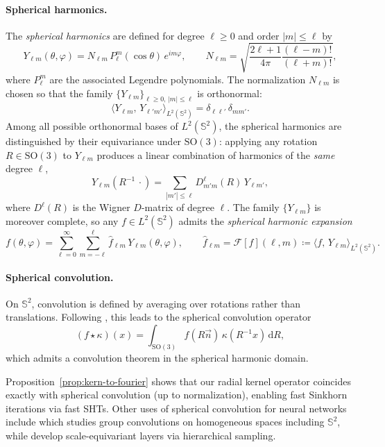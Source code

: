 \documentclass{article}
\theoremstyle{plain}
\theoremstyle{definition}
\theoremstyle{remark}
\renewcommand{\S}{\ensuremath{\mathbb{S}}}
\begin{document}
\paragraph{Spherical harmonics.}
The \emph{spherical harmonics} are defined for degree $\ell \ge 0$ and order $|m| \le \ell$ by
\[
Y_{\ell m}(\theta,\varphi)
= N_{\ell m}\, P_\ell^m(\cos\theta)\, e^{im\varphi},
\qquad
N_{\ell m} = \sqrt{\frac{2\ell+1}{4\pi}\frac{(\ell-m)!}{(\ell+m)!}},
\]
where $P_\ell^m$ are the associated Legendre polynomials.
The normalization $N_{\ell m}$ is chosen so that the family $\{Y_{\ell m}\}_{\ell \ge 0,\,|m|\le\ell}$ is orthonormal:
\[
\langle Y_{\ell m},\, Y_{\ell' m'} \rangle_{L^2(\S^2)} = \delta_{\ell\ell'}\,\delta_{mm'}.
\]
Among all possible orthonormal bases of $L^2(\S^2)$, the spherical harmonics are distinguished by their equivariance under $\mathrm{SO}(3)$: applying any rotation $R \in \mathrm{SO}(3)$ to $Y_{\ell m}$ produces a linear combination of harmonics of the \emph{same} degree $\ell$,
\[
Y_{\ell m}(R^{-1}\,\cdot) = \sum_{|m'|\le\ell} D^\ell_{m'm}(R)\, Y_{\ell m'},
\]
where $D^\ell(R)$ is the Wigner $D$-matrix of degree $\ell$.
The family $\{Y_{\ell m}\}$ is moreover complete, so any $f \in L^2(\S^2)$ admits the \emph{spherical harmonic expansion}
\[
f(\theta,\varphi)
= \sum_{\ell=0}^{\infty}\sum_{m=-\ell}^{\ell}
  \widehat{f}_{\ell m}\, Y_{\ell m}(\theta,\varphi),
\qquad
\widehat{f}_{\ell m} = \mathcal{F}[f](\ell,m)
\coloneqq \langle f,\, Y_{\ell m}\rangle_{L^2(\S^2)}.
\]

\paragraph{Spherical convolution.}
On $\S^2$, convolution is defined by averaging over rotations rather than translations. Following \cite{driscoll1994computing}, this leads to the spherical convolution operator
\[
(f \star \kappa)(x) = \int_{\mathrm{SO}(3)} f(R\vec{n}) \, \kappa(R^{-1}x) \, \mathrm{d}R,
\]
which admits a convolution theorem in the spherical harmonic domain.

Proposition~\ref{prop:kern-to-fourier} shows that our radial kernel operator coincides exactly with spherical convolution (up to normalization), enabling fast Sinkhorn iterations via fast SHTs. Other uses of spherical convolution for neural networks include \cite{kondor2018generalization} which studies group convolutions on homogeneous spaces including $\S^2$, while \cite{sosnovik2021disco} develop scale-equivariant layers via hierarchical sampling.
\end{document}
